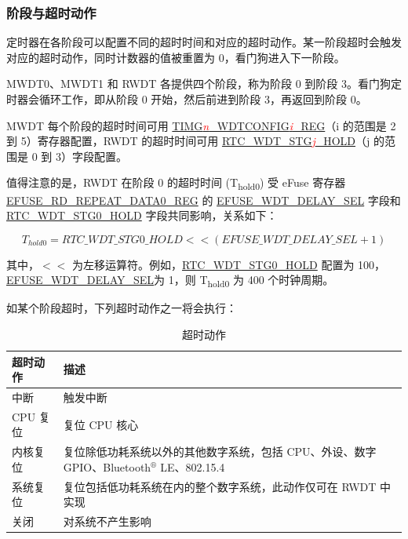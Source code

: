 \documentclass[main\_\_CN.tex]{subfiles}
\begin{document}
\subsubsection{阶段与超时动作}\label{sec:wdt-timeout}
定时器在各阶段可以配置不同的超时时间和对应的超时动作。某一阶段超时会触发对应的超时动作，同时计数器的值被重置为 0，看门狗进入下一阶段。


MWDT0、MWDT1 和 RWDT 各提供四个阶段，称为阶段 0 到阶段 3。看门狗定时器会循环工作，即从阶段 0 开始，然后前进到阶段 3，再返回到阶段 0。

MWDT 每个阶段的超时时间可用 \hyperref[regdesc:TIMGWDTCONFIG2REG]{TIMG\textcolor{red}{\it{n}}\_WDTCONFIG\textcolor{red}{\it{i}}\_REG}（i 的范围是 2 到 5）寄存器配置，RWDT 的超时时间可用 \hyperref[fielddesc:RTCWDTSTG3HOLD]{RTC\_WDT\_STG\textcolor{red}{\it{j}}\_HOLD}（j 的范围是 0 到 3）字段配置。

值得注意的是，RWDT 在阶段 0 的超时时间 (T\textsubscript{hold0}) 受 eFuse 寄存器 \hyperref[regdesc:EFUSERDREPEATDATA0REG]{EFUSE\_RD\_REPEAT\_DATA0\_REG} 的 \hyperref[fielddesc:EFUSEWDTDELAYSEL]{EFUSE\_WDT\_DELAY\_SEL} 字段和 \hyperref[fielddesc:RTCWDTSTG0HOLD]{RTC\_WDT\_STG0\_HOLD} 字段共同影响，关系如下：

\begin{displaymath}
T_{hold0} = \hyperref[fielddesc:RTCWDTSTG0HOLD]{RTC\_WDT\_STG0\_HOLD}   << (\hyperref[fielddesc:EFUSEWDTDELAYSEL]{EFUSE\_WDT\_DELAY\_SEL} + 1)
\end{displaymath}

其中，$<<$ 为左移运算符。例如，\hyperref[fielddesc:RTCWDTSTG0HOLD]{RTC\_WDT\_STG0\_HOLD} 配置为 100，\hyperref[fielddesc:EFUSEWDTDELAYSEL]{EFUSE\_WDT\_DELAY\_SEL}为 1，则 T\textsubscript{hold0} 为 400 个时钟周期。

如某个阶段超时，下列超时动作之一将会执行：
\begin{table}[H]
\centering
\caption{超时动作}
\label{tab:wdt-timeout-action}

\begin{tabular}{|l|m{12cm}|}
\hline
\rowcolor{lightgray}
    \textbf{超时动作} & \textbf{描述} \\\hline

    中断 &  触发中断 \\ \hline
    CPU 复位 &  复位 CPU 核心 \\ \hline
    内核复位 &  复位除低功耗系统以外的其他数字系统，包括 CPU、外设、数字 GPIO、Bluetooth$^®$ LE、802.15.4\\ \hline
    系统复位 &  复位包括低功耗系统在内的整个数字系统，此动作仅可在 RWDT 中实现 \\ \hline
    关闭 &  对系统不产生影响\\ \hline

\end{tabular}
\end{table}
\end{document}
